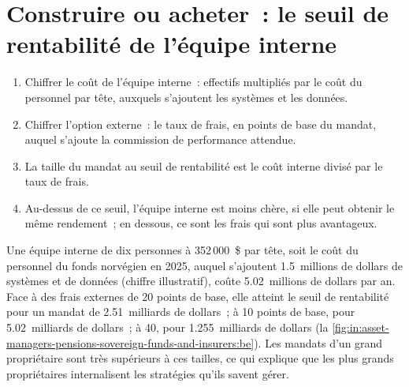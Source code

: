 \section{Construire ou acheter~: le seuil de rentabilité de l'équipe interne}

\begin{method}\label{met:in:asset-managers-pensions-sovereign-funds-and-insurers:be}
\begin{enumerate}
\item Chiffrer le coût de l'équipe interne~: effectifs multipliés par le coût du personnel par tête, auxquels s'ajoutent les systèmes et les données.
\item Chiffrer l'option externe~: le taux de frais, en points de base du mandat, auquel s'ajoute la commission de performance attendue.
\item La taille du mandat au seuil de rentabilité est le coût interne divisé par le taux de frais.
\item Au-dessus de ce seuil, l'équipe interne est moins chère, si elle peut obtenir le même rendement~; en dessous, ce sont les frais qui sont plus avantageux.
\end{enumerate}
\end{method}

\begin{example}\label{ex:in:asset-managers-pensions-sovereign-funds-and-insurers:team}
Une équipe interne de dix personnes à 352\,000~\$ par tête, soit le coût du personnel du fonds norvégien en 2025, auquel s'ajoutent 1.5~millions de dollars de systèmes
et de données (chiffre illustratif), coûte 5.02~millions de dollars par an. Face à des frais externes de 20 points de base, elle atteint le seuil de rentabilité pour un
mandat de 2.51~milliards de dollars~; à 10 points de base, pour 5.02~milliards de dollars~; à 40, pour 1.255~milliards de dollars
(la \cref{fig:in:asset-managers-pensions-sovereign-funds-and-insurers:be}). Les mandats d'un grand propriétaire sont très supérieurs à ces
tailles, ce qui explique que les plus grands propriétaires internalisent les stratégies qu'ils savent gérer.
\end{example}

